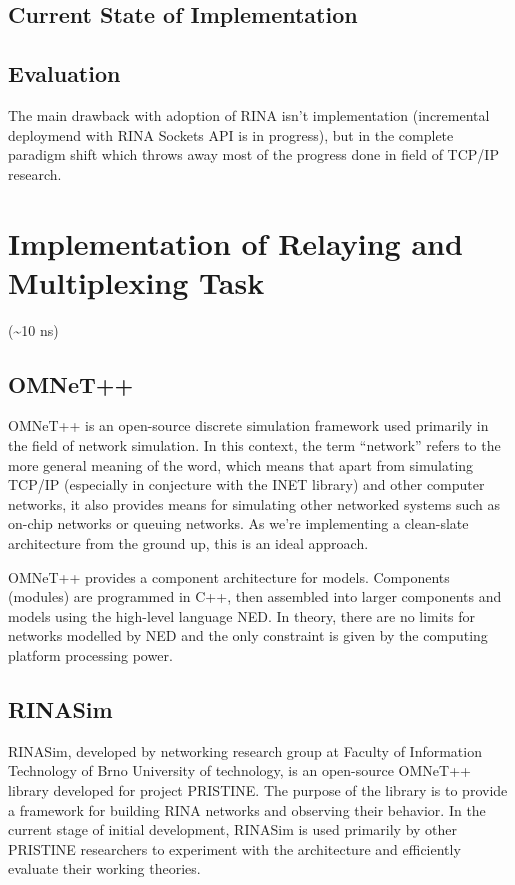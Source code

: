     \section{Current State of Implementation}
    \section{Evaluation}

        The main drawback with adoption of RINA isn't implementation (incremental deploymend with RINA Sockets API is in progress), but in the complete paradigm shift which throws away most of the progress done in field of TCP/IP research.


\chapter{Implementation of Relaying and Multiplexing Task}
    (\textasciitilde10 ns)
    \section{OMNeT++}
        OMNeT++ is an open-source discrete simulation framework used primarily in the field of network simulation. In this context, the term ``network'' refers to the more general meaning of the word, which means that apart from simulating TCP/IP (especially in conjecture with the INET library) and other computer networks, it also provides means for simulating other networked systems such as on-chip networks or queuing networks. As we're implementing a clean-slate architecture from the ground up, this is an ideal approach.

        OMNeT++ provides a component architecture for models. Components (modules) are programmed in C++, then assembled into larger components and models using the high-level language NED. In theory, there are no limits for networks modelled by NED and the only constraint is given by the computing platform processing power.

    \section{RINASim}
        RINASim, developed by networking research group at Faculty of Information Technology of Brno University of technology, is an open-source OMNeT++ library developed for project PRISTINE. The purpose of the library is to provide a framework for building RINA networks and observing their behavior. In the current stage of initial development, RINASim is used primarily by other PRISTINE researchers to experiment with the architecture and efficiently evaluate their working theories.

